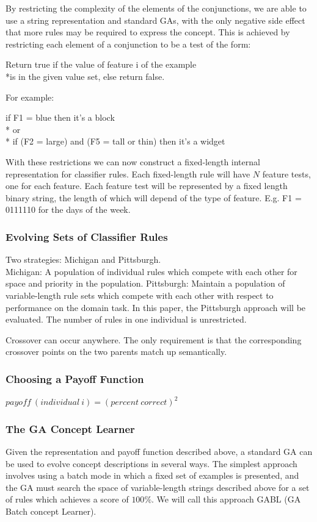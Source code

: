 \documentclass[12pt]{article}
\begin{document}
By restricting the complexity of the elements of the conjunctions, we are able to use a string representation and standard GAs, with the only negative side effect that more rules may be required to express the concept. This is achieved by restricting each element of a conjunction to be a test of the form:
\begin{center}
Return true if the value of feature i of the example\\*is in the given value set, else return false.
\end{center}
For example:
\begin{center}
if F1 = blue then it's a block\\*
or\\*
if (F2 = large) and (F5 = tall or thin) then it's a widget
\end{center}
With these restrictions we can now construct a fixed-length internal representation for classifier rules. Each fixed-length rule will have $N$ feature tests, one for each feature. Each feature test will be represented by a fixed length binary string, the length of which will depend of the type of feature. E.g. F1 = 0111110 for the days of the week.

\subsubsection{Evolving Sets of Classifier Rules}
Two strategies: Michigan and Pittsburgh.\\
Michigan: A population of individual rules which compete with each other for space and priority in the population. Pittsburgh: Maintain a population of variable-length rule sets which compete with each other with respect to performance on the domain task. In this paper, the Pittsburgh approach will be evaluated. The number of rules in one individual is unrestricted.

Crossover can occur anywhere. The only requirement is that the corresponding crossover points on the two parents match up semantically.

\subsubsection{Choosing a Payoff Function}
\begin{center}
$payoff\ (individual\ i) = (percent\ correct)^2$
\end{center}

\subsubsection{The GA Concept Learner}
Given the representation and payoff function described above, a standard GA can be used to evolve concept descriptions in several ways. The simplest approach involves using a batch mode in which a fixed set of examples is presented, and the GA must search the space of variable-length strings described above for a set of rules which achieves a score of $100\%$. We will call this approach GABL (GA Batch concept Learner).
\end{document}
